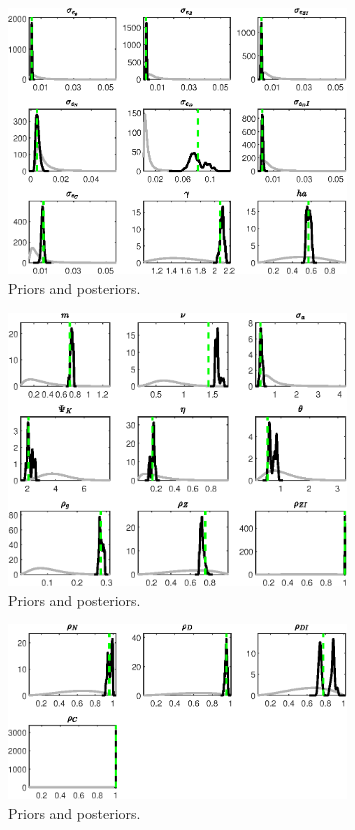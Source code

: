  
\begin{figure}[H]
\centering
\includegraphics[width=0.80\textwidth]{BRS_growth/Output/BRS_growth_PriorsAndPosteriors1}
\caption{Priors and posteriors.}\label{Fig:PriorsAndPosteriors:1}
\end{figure}
 
\begin{figure}[H]
\centering
\includegraphics[width=0.80\textwidth]{BRS_growth/Output/BRS_growth_PriorsAndPosteriors2}
\caption{Priors and posteriors.}\label{Fig:PriorsAndPosteriors:2}
\end{figure}
 
\begin{figure}[H]
\centering
\includegraphics[width=0.80\textwidth]{BRS_growth/Output/BRS_growth_PriorsAndPosteriors3}
\caption{Priors and posteriors.}\label{Fig:PriorsAndPosteriors:3}
\end{figure}
 
